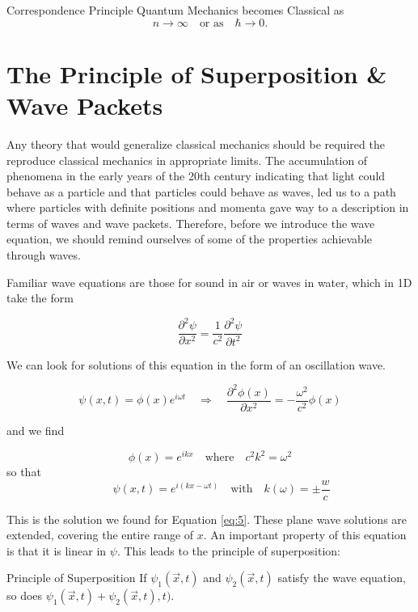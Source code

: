 \begin{mainbox}{Correspondence Principle}
  Quantum Mechanics becomes Classical as
  \[ n \rightarrow \infty \quad \text{or as} \quad \hbar \rightarrow 0 .\]
\end{mainbox}


\section{The Principle of Superposition \& Wave Packets}

Any theory that would generalize classical mechanics should be required the
reproduce classical mechanics in appropriate limits. The accumulation of
phenomena in the early years of the 20th century indicating that light could
behave as a particle and that particles could behave as waves, led us to a path
where particles with definite positions and momenta gave way to a description
in terms of waves and wave packets. Therefore, before we introduce the wave
equation, we should remind ourselves of some of the properties achievable
through waves. 

Familiar wave equations are those for sound in air or waves in water, which in
1D take the form 

\[
\frac{\partial^2 \psi}{\partial x^2} = \frac{1}{c^2} \frac{\partial^2
\psi}{\partial t^2} 
\] \vspace{3px}

We can look for solutions of this equation in the form of an oscillation wave. 

\[
  \psi(x, t) = \phi(x)e^{i\omega t} \quad \Rightarrow \quad \frac{\partial^2
  \phi(x)}{\partial x^2} = -\frac{\omega^2}{c^2}\phi(x)
\] \vspace{3px}

and we find 

\[
\phi(x) = e^{ikx} \quad \text{where} \quad c ^2k^2 = \omega^2 \] so
  that \[ \qquad \psi(x,t) = e^{i(kx - \omega t)} \quad \text{with} \quad  k(\omega)
    = \pm \frac{w}{c}
  \] \vspace{3px}

This is the solution we found for Equation \ref{eq:5}. These plane wave
solutions are extended, covering the entire range of $x$. An important property
of this equation is that it is linear in $\psi$. This leads to the principle of
superposition: 

\begin{subbox}{Principle of Superposition}
  If $\psi_1(\vec{x}, t)$ and $\psi_2(\vec{x}, t)$ satisfy the wave equation,
  so does $\psi_1(\vec{x}, t) + \psi_2(\vec{x}, t), t).$
\end{subbox}

